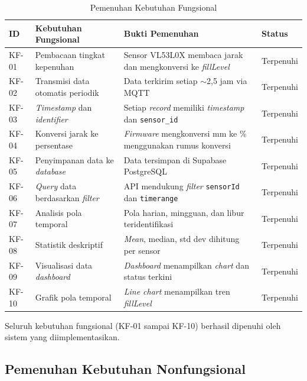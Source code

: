 \begin{table}[H]
  \caption{Pemenuhan Kebutuhan Fungsional}
  \label{tab:pemenuhan-kf-hasil}
  \begin{tabularx}{\textwidth}{| l | X | X | l |}
    \hline
    \textbf{ID} & \textbf{Kebutuhan Fungsional} & \textbf{Bukti Pemenuhan} & \textbf{Status} \\
    \hline
    KF-01 & Pembacaan tingkat kepenuhan & Sensor VL53L0X membaca jarak dan mengkonversi ke \textit{fillLevel} & Terpenuhi \\
    \hline
    KF-02 & Transmisi data otomatis periodik & Data terkirim setiap $\sim$2,5 jam via MQTT & Terpenuhi \\
    \hline
    KF-03 & \textit{Timestamp} dan \textit{identifier} & Setiap \textit{record} memiliki \textit{timestamp} dan \texttt{sensor\_id} & Terpenuhi \\
    \hline
    KF-04 & Konversi jarak ke persentase & \textit{Firmware} mengkonversi mm ke \% menggunakan rumus konversi & Terpenuhi \\
    \hline
    KF-05 & Penyimpanan data ke \textit{database} & Data tersimpan di Supabase PostgreSQL & Terpenuhi \\
    \hline
    KF-06 & \textit{Query} data berdasarkan \textit{filter} & API mendukung \textit{filter} \texttt{sensorId} dan \texttt{timerange} & Terpenuhi \\
    \hline
    KF-07 & Analisis pola temporal & Pola harian, mingguan, dan libur teridentifikasi & Terpenuhi \\
    \hline
    KF-08 & Statistik deskriptif & \textit{Mean}, median, std dev dihitung per sensor & Terpenuhi \\
    \hline
    KF-09 & Visualisasi data \textit{dashboard} & \textit{Dashboard} menampilkan \textit{chart} dan status terkini & Terpenuhi \\
    \hline
    KF-10 & Grafik pola temporal & \textit{Line chart} menampilkan tren \textit{fillLevel} & Terpenuhi \\
    \hline
  \end{tabularx}
\end{table}

Seluruh kebutuhan fungsional (KF-01 sampai KF-10) berhasil dipenuhi oleh sistem yang diimplementasikan.

\subsection{Pemenuhan Kebutuhan Nonfungsional}

